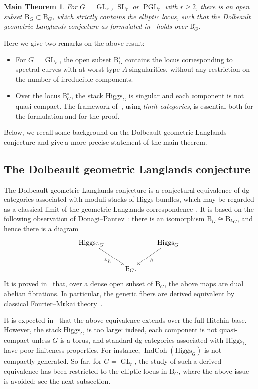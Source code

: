 \documentclass[11pt,oneside,a4paper,mathscr]{amsart}
\newtheorem*{mainthm}{Main Theorem}
\theoremstyle{definition}
\renewcommand{\geq}{\geqslant}
\newcommand{\rB}{\mathrm{B}}
\newcommand{\IndCoh}{\operatorname{IndCoh}}
\newcommand{\GL}{\operatorname{GL}}
\newcommand{\SL}{\operatorname{SL}}
\newcommand{\PGL}{\operatorname{PGL}}
\newcommand{\Hig}{\mathrm{Higgs}}
\begin{document}
\begin{mainthm}
For $G=\GL_r$, $\SL_r$ or $\PGL_r$ with $r\geq 2$, there is an open subset $\rB_G^{\circ} \subset \rB_G$, which strictly 
contains the elliptic locus, such that 
the Dolbeault geometric Langlands conjecture as formulated in~\cite{PTlim}
holds over $\rB_G^{\circ}$. 
\end{mainthm}
Here we give two remarks on the above result:
\begin{itemize}[leftmargin=1.5em]
\item For $G=\GL_r$, the open subset $\mathrm{B}^{\circ}_G$ contains the locus corresponding to spectral curves with at worst type $A$ singularities, without any restriction on the number of irreducible components.
\item Over the locus $\rB_G^{\circ}$, the stack $\Hig_G$ is singular and each component is not quasi-compact. The framework of~\cite{PTlim}, using \textit{limit categories}, is essential both for the formulation and for the proof.
\end{itemize}


Below, we recall some background on the Dolbeault geometric Langlands conjecture and give a more precise statement of the main theorem.


\subsection{The Dolbeault geometric Langlands conjecture}
The Dolbeault geometric Langlands conjecture is a conjectural equivalence 
of dg-categories associated with moduli stacks of Higgs bundles, which 
may be regarded as a classical limit of the geometric Langlands correspondence~\cite{BD0, GLC1, GLC2, GLC3, GLC4, GLC5}. 
It is based on the following observation of Donagi--Pantev~\cite{DoPa}:
there is an isomorphism $\rB_G\cong\rB_{{}^{L}G}$, and hence there is a diagram 
\begin{align*}
    \xymatrix{
\Hig_{{}^{L}G} \ar[rd]_-{{}^{L}h} & & \Hig_G \ar[ld]^-{h} \\
& \rB_G. &
    }
\end{align*}
It is proved in~\cite{DoPa} that, over a dense open subset of $\rB_G$, the above 
maps are dual abelian fibrations. In particular, the generic fibers 
are derived equivalent by classical Fourier--Mukai theory~\cite{Mu1}.

It is expected in~\cite{DoPa} that the above equivalence extends over 
the full Hitchin base. However, the stack $\Hig_G$ is too large: indeed, each 
component is not quasi-compact unless $G$ is a torus, 
and 
standard dg-categories associated with $\Hig_G$ have poor finiteness properties. For instance,
$\IndCoh(\Hig_G)$ is not compactly generated. So far, for $G=\GL_r$, the study of such a derived equivalence has been restricted to the elliptic locus in $\rB_G$, where the above issue is avoided; see the next subsection.
\end{document}

